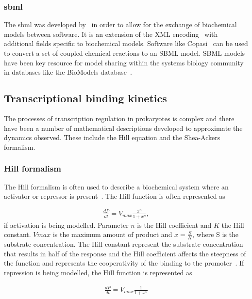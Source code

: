 \subsubsection{\acrfull{sbml}}

The \acrfull{sbml} was developed by~\textcite{Hucka:2004wh} in order to allow for the exchange of biochemical models between software. It is an extension of the XML encoding~\autocite{DuCharme:1999} with additional fields specific to biochemical models. Software like Copasi~\autocite{Hoops:2006gy} can be used to convert a set of coupled chemical reactions to an SBML model. SBML models have been key resource for model sharing within the systems biology community~\autocite{Wilkinson:2006td} in databases like the BioModels database~\autocite{LeNovere:2006ep}. 

\subsection{Transcriptional binding kinetics}

The processes of transcription regulation in prokaryotes is complex and there have been a number of mathematical descriptions developed to approximate the dynamics observed. These include the Hill equation and the Shea-Ackers formalism. 

\subsubsection{Hill formalism}

The Hill formalism is often used to describe a biochemical system where an activator or repressor is present~\autocite{Alon:2007}. The Hill function is often represented as

\begin{align*}
	\frac{dP}{dt} = V_{max}\frac{x^n}{1 + x^n},
\end{align*}
\noindent if activation is being modelled. Parameter $n$ is the Hill coefficient and $K$ the Hill constant. $V{max}$ is the maximum amount of product and $x = \frac{S}{K}$, where S is the substrate concentration. The Hill constant represent the substrate concentration that results in half of the response and the Hill coefficient affects the steepness of the function and represents the cooperativity of the binding to the promoter~\autocite{Alon:2007}. If repression is being modelled, the Hill function is represented as

\begin{align*}
	\frac{dP}{dt} = V_{max}\frac{1}{1 + x^n}
\end{align*}



